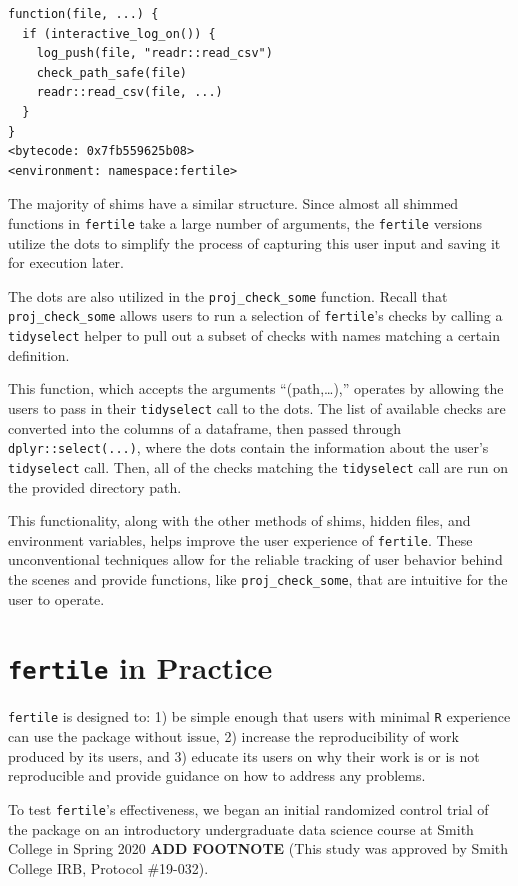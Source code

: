 \documentclass[12pt,twoside]{reedthesis}
\begin{document}
\begin{verbatim}
function(file, ...) {
  if (interactive_log_on()) {
    log_push(file, "readr::read_csv")
    check_path_safe(file)
    readr::read_csv(file, ...)
  }
}
<bytecode: 0x7fb559625b08>
<environment: namespace:fertile>
\end{verbatim}
The majority of shims have a similar structure. Since almost all shimmed
functions in \texttt{fertile} take a large number of arguments, the
\texttt{fertile} versions utilize the dots to simplify the process of
capturing this user input and saving it for execution later.

The dots are also utilized in the \texttt{proj\_check\_some} function.
Recall that \texttt{proj\_check\_some} allows users to run a selection
of \texttt{fertile}'s checks by calling a \texttt{tidyselect} helper to
pull out a subset of checks with names matching a certain definition.

This function, which accepts the arguments ``(path,\ldots{}),'' operates
by allowing the users to pass in their \texttt{tidyselect} call to the
dots. The list of available checks are converted into the columns of a
dataframe, then passed through \texttt{dplyr::select(...)}, where the
dots contain the information about the user's \texttt{tidyselect} call.
Then, all of the checks matching the \texttt{tidyselect} call are run on
the provided directory path.

This functionality, along with the other methods of shims, hidden files,
and environment variables, helps improve the user experience of
\texttt{fertile}. These unconventional techniques allow for the reliable
tracking of user behavior behind the scenes and provide functions, like
\texttt{proj\_check\_some}, that are intuitive for the user to operate.

\section{\texorpdfstring{\texttt{fertile} in
Practice}{fertile in Practice}}\label{fertile-in-practice}

\texttt{fertile} is designed to: 1) be simple enough that users with
minimal \texttt{R} experience can use the package without issue, 2)
increase the reproducibility of work produced by its users, and 3)
educate its users on why their work is or is not reproducible and
provide guidance on how to address any problems.

To test \texttt{fertile}'s effectiveness, we began an initial randomized
control trial of the package on an introductory undergraduate data
science course at Smith College in Spring 2020 \textbf{ADD FOOTNOTE}
(This study was approved by Smith College IRB, Protocol \#19-032).
\end{document}
